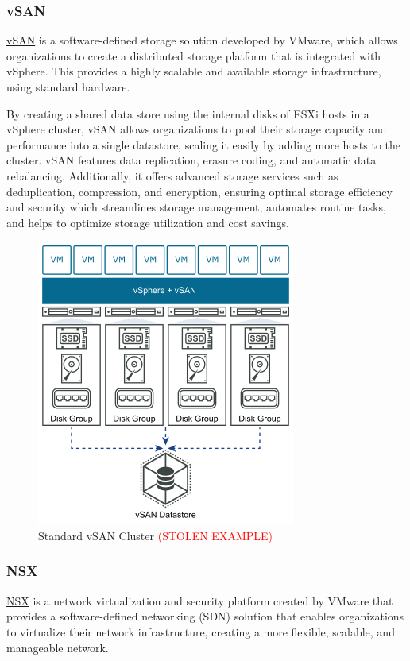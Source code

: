 \subsubsection{vSAN}
\href{https://docs.vmware.com/en/VMware-vSphere/7.0/com.vmware.vsphere.vsan-planning.doc/GUID-A80526C8-A941-4F84-9D44-D4B8B3914A95.html}{vSAN} is a software-defined storage solution developed by VMware, which allows organizations to create a distributed storage platform that is integrated with vSphere. This provides a highly scalable and available storage infrastructure, using standard hardware.

By creating a shared data store using the internal disks of ESXi hosts in a vSphere cluster, vSAN allows organizations to pool their storage capacity and performance into a single datastore, scaling it easily by adding more hosts to the cluster. vSAN features data replication, erasure coding, and automatic data rebalancing. Additionally, it offers advanced storage services such as deduplication, compression, and encryption, ensuring optimal storage efficiency and security which streamlines storage management, automates routine tasks, and helps to optimize storage utilization and cost savings.

\begin{figure}[H]
    \centering
    \includegraphics[scale = .8]{images/vsan-deployment.png}
    \caption{Standard vSAN Cluster \textcolor{red}{(STOLEN EXAMPLE)} }
    \label{vSan}
\end{figure}

\subsubsection{NSX}
\href{https://docs.vmware.com/en/VMware-NSX/index.html}{NSX} is a network virtualization and security platform created by VMware that provides a software-defined networking (SDN) solution that enables organizations to virtualize their network infrastructure, creating a more flexible, scalable, and manageable network.

